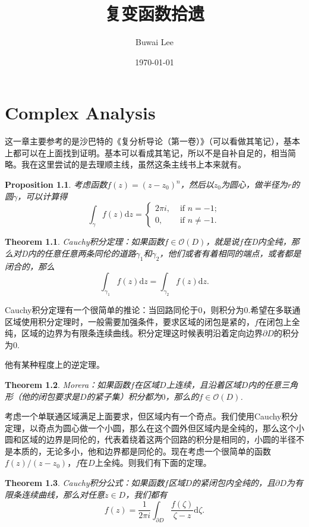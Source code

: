 \documentclass[10pt]{book}
\theoremstyle{plain}%
\newtheorem{pro}{Proposition}[chapter]%
\newtheorem{theo}{Theorem}[chapter]%
\begin{document}
\title{复变函数拾遗}
\author{Buwai Lee}
\date{\today}
\maketitle %

\chapter{Complex Analysis}
这一章主要参考的是沙巴特的《复分析导论（第一卷）》（可以看做其笔记），基本上都可以在上面找到证明。基本可以看成其笔记，所以不是自补自足的，相当简略。我在这里尝试的是去理顺主线，虽然这条主线书上本来就有。

\begin{pro}
考虑函数$f(z)=(z-z_0)^n$，然后以$z_0$为圆心，做半径为$r$的圆$\gamma$，可以计算得\[
\int_{\gamma}f(z)\mathrm{d}z=\begin{cases}
	2\pi i, &\text{ if }n=-1;\\
	0,&\text{ if }n\neq-1.
\end{cases}
\]
\end{pro}
\begin{theo}
	Cauchy积分定理：如果函数$f \in \mathcal{O}(D)$，就是说$f$在D内全纯，那么对D内的任意任意两条同伦的道路$\gamma_1$和$\gamma_2$，他们或者有着相同的端点，或者都是闭合的，那么
	\[
		\int_{\gamma_1}f(z)\mathrm{d}z=\int_{\gamma_2}f(z)\mathrm{d}z.
	\]
\end{theo}
Cauchy积分定理有一个很简单的推论：当回路同伦于0，则积分为0.希望在多联通区域使用积分定理时，一般需要加强条件，要求区域的闭包是紧的，$f$在闭包上全纯，区域的边界为有限条连续曲线。积分定理这时候表明沿着定向边界$\partial D$的积分为0.

他有某种程度上的逆定理。
\begin{theo}
	Morera：如果函数$f $在区域$D$上连续，且沿着区域$D$内的任意三角形（他的闭包要求是$D$的紧子集）积分都为$0$，那么的$f \in \mathcal{O}(D)$.
\end{theo}
考虑一个单联通区域满足上面要求，但区域内有一个奇点。我们使用Cauchy积分定理，以奇点为圆心做一个小圆，那么在这个圆外但区域内是全纯的，那么这个小圆和区域的边界是同伦的，代表着绕着这两个回路的积分是相同的，小圆的半径不是本质的，无论多小，他和边界都是同伦的。现在考虑一个很简单的函数$f(z)/(z-z_0)$，$f$在$D$上全纯。则我们有下面的定理。

\begin{theo}
	Cauchy积分公式：如果函数$f$区域$D$的紧闭包内全纯的，且$\partial D$为有限条连续曲线，那么对任意$z\in D$，我们都有
	\[
		f(z)=\frac{1}{2\pi i}\int_{\partial D}\frac{f(\zeta)}{\zeta -z}\mathrm{d}\zeta.
	\]
\end{theo}
\end{document}
